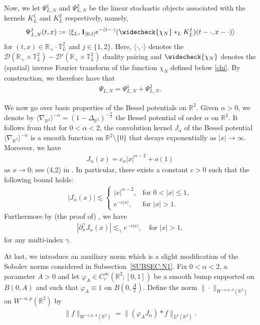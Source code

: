 \documentclass[letterpaper, 11pt,  reqno]{amsart}
\theoremstyle{myremark}
\newcommand{\1}{\hspace{0.5mm}\text{I}\hspace{0.5mm}}
\newcommand{\R}{\mathbb{R}}
\newcommand{\T}{\mathbb{T}}
\newcommand{\D}{\mathcal{D}}
\newcommand{\al}{\alpha}
\newcommand{\Dl}{\Delta}
\newcommand{\g}{\gamma}
\newcommand{\les}{\lesssim}
\newcommand{\jb}[1]
{\langle #1 \rangle}
\newcommand{\ind}{\mathbf 1}
\numberwithin{equation}{section}
\numberwithin{theorem}{section}
\begin{document}
Now, we let $\Psi^{1}_{L,N}$ and $\Psi^2_{L,N}$ be the linear stochastic objects associated with the kernels $K^1_L$ and $K^2_L$ respectively, namely,
\begin{align}
\Psi^j_{L,N} (t,x) := \jb{\xi_L, \ind_{[0,t]} e^{-(t - \cdot)} (\widecheck{\chi_N} *_L K^j_L)(t- \cdot, x- \cdot)}
\label{KerY4}
\end{align}
for $(t,x) \in \R_+ \cdot \T^2_L$ and $j \in \{1,2\}$. Here, $\jb{\cdot, \cdot}$ denotes the $\D(\R_+ \times \T^2_L)-\D'(\R_+ \times \T^2_L)$ duality pairing and $\widecheck{\chi_N}$ denotes the (spatial) inverse Fourier transform of the function $\chi_N$ defined below \eqref{chi}. By construction, we therefore have that
\begin{align}
\Psi_{L,N} = \Psi^1_{L,N} + \Psi^2_{L,N}.
\label{KerY5}
\end{align}

We now go over basic properties of the  Bessel potentials 
on $\R^2$.
Given $\al>0$, 
 we denote by $\jb{\nabla_{\R^2}}^{-\al} = (1-\Dl_{\R^2})^{-\frac{\al}2}$
 the Bessel potential of order $\al$ on $\R^2$. It follows from \cite[Proposition 1.2.5]{Gra2}
 that for $0 < \al < 2$, 
 the convolution kernel $J_\al$ of 
 the Bessel potential $\jb{\nabla_{\R^2}}^{-\al}$ is a smooth function on $\R^2\setminus\{0\}$
that decays exponentially as $|x|\to \infty$.
 Moreover, 
we have 
 \begin{align*}
 J_\al(x) = c_{\al} |x|^{\al - 2} + o(1)
 \end{align*}
  as $x \to 0$; 
 see (4,2) in \cite{AS}. In particular, there exists a constant $c>0$ such that the following bound holds:
 \begin{align*}
 |J_\al(x)| \les 
 \begin{cases} |x|^{\al - 2},   & \text{for $0 < |x| \le 1$},  \\
 e^{-c|x|},   & \text{for $|x| >1$}.
 \end{cases}
 \end{align*}
Furthermore by (the proof of) \cite[Proposition 1.2.5]{Gra2}, we have
\begin{align}
|\partial_x^{\g} J_{\al}(x)| \les_{\g} e^{-c|x|}, \quad \text{for $|x| >1$},
\label{YYY1}
\end{align}
for any multi-index $\g$.

At last, we introduce an auxiliary norm which is a slight modification of the Sobolev norms considered in Subsection~\ref{SUBSEC:N1}. Fix $0<\al<2$, a parameter $A >0$ and let $\varphi_A \in C_c^{\infty}(\R^2; [0,1])$ be a smooth bump supported on $B(0,A)$ and such that $\varphi_A \equiv 1$ on $B(0,\frac A2)$. Define the norm $\| \cdot \|_{W^{-\al,p, A}(\R^2)}$ on $W^{-\al,p}(\R^2)$ by 
\begin{align*}
\|f\|_{W^{-\al,p, A}(\R^2)} = \| (\varphi_A J_{\al}) * f \|_{L^p(\R^2)}.
\end{align*}
\end{document}
